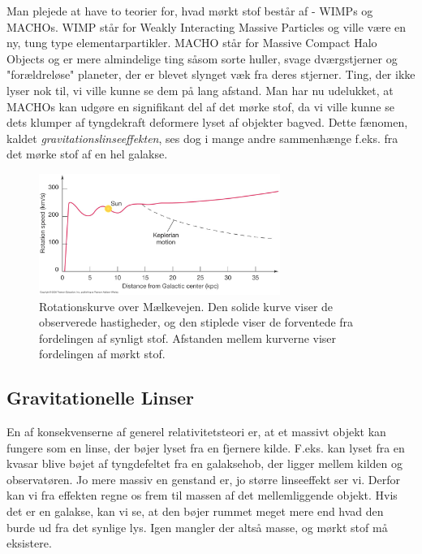 Man plejede at have to teorier for, hvad mørkt stof består af - WIMPs og MACHOs. WIMP står for Weakly Interacting Massive Particles og ville være en ny, tung type elementarpartikler. MACHO står for Massive Compact Halo Objects og er mere almindelige ting såsom sorte huller, svage dværgstjerner og "forældreløse" planeter, der er blevet slynget væk fra deres stjerner. Ting, der ikke lyser nok til, vi ville kunne se dem på lang afstand. Man har nu udelukket, at MACHOs kan udgøre en signifikant del af det mørke stof, da vi ville kunne se dets klumper af tyngdekraft deformere lyset af objekter bagved. Dette fænomen, kaldet \emph{gravitationslinseeffekten}, ses dog i mange andre sammenhænge f.eks. fra det mørke stof af en hel galakse. 

\begin{figure}[h!]
	\centering
	\includegraphics[width=0.7\textwidth]{Astrofysik/Astrofig/rotationskurve.jpg}
	\caption{Rotationskurve over Mælkevejen. Den solide kurve viser de observerede hastigheder, og den stiplede viser de forventede fra fordelingen af synligt stof. Afstanden mellem kurverne viser fordelingen af mørkt stof. 
		}
	\label{rotationskurve}
\end{figure}

\subsection{Gravitationelle Linser}

En af konsekvenserne af generel relativitetsteori er, at et massivt objekt kan fungere som en linse, der bøjer lyset fra en fjernere kilde. F.eks. kan lyset fra en kvasar blive bøjet af tyngdefeltet fra en galaksehob, der ligger mellem kilden og observatøren. Jo mere massiv en genstand er, jo større linseeffekt ser vi. Derfor kan vi fra effekten regne os frem til massen af det mellemliggende objekt. Hvis det er en galakse, kan vi se, at den bøjer rummet meget mere end hvad den burde ud fra det synlige lys. Igen mangler der altså masse, og mørkt stof må eksistere.


